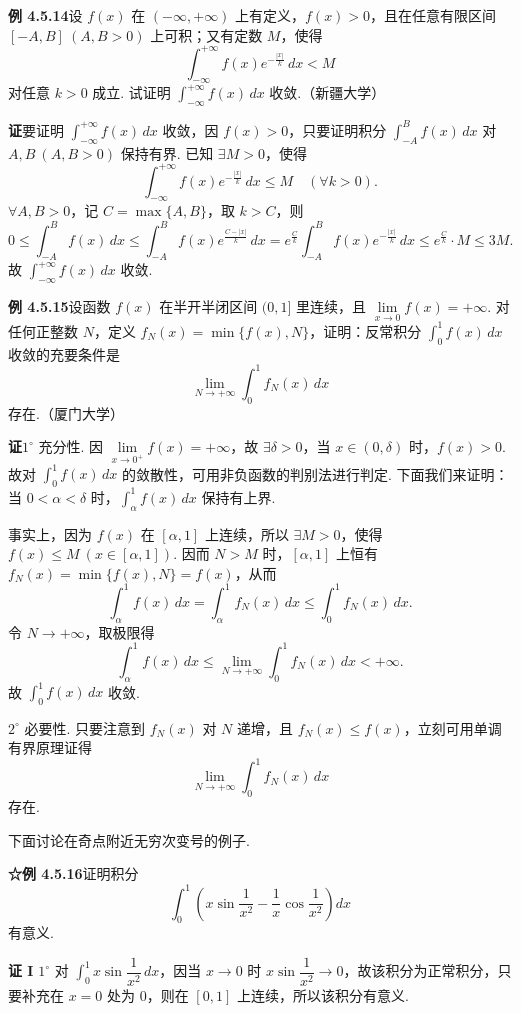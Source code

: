 \documentclass[UTF8, 12pt, fontset=fandol, oneside]{ctexart}
\begin{document}
\noindent\textbf{例 4.5.14}\quad 设 $f(x)$ 在 $(-\infty,+\infty)$ 上有定义，$f(x)>0$，且在任意有限区间 $[-A,B]\ (A,B>0)$ 上可积；又有定数 $M$，使得
\[
\int_{-\infty}^{+\infty}f(x)e^{-\frac{|x|}{k}}\,dx<M
\]
对任意 $k>0$ 成立. 试证明 $\displaystyle\int_{-\infty}^{+\infty}f(x)\,dx$ 收敛.（新疆大学）

\noindent\textbf{证}\quad 要证明 $\displaystyle\int_{-\infty}^{+\infty}f(x)\,dx$ 收敛，因 $f(x)>0$，只要证明积分 $\displaystyle\int_{-A}^B f(x)\,dx$ 对 $A,B\ (A,B>0)$ 保持有界. 已知 $\exists M>0$，使得
\[
\int_{-\infty}^{+\infty}f(x)e^{-\frac{|x|}{k}}\,dx\le M\quad(\forall k>0).
\]
$\forall A,B>0$，记 $C=\max\{A,B\}$，取 $k>C$，则
\[
0\le\int_{-A}^B f(x)\,dx
\le\int_{-A}^B f(x)e^{\frac{C-|x|}{k}}\,dx
=e^{\frac Ck}\int_{-A}^B f(x)e^{-\frac{|x|}{k}}\,dx
\le e^{\frac Ck}\cdot M\le3M.
\]
故 $\displaystyle\int_{-\infty}^{+\infty}f(x)\,dx$ 收敛.

\noindent\textbf{例 4.5.15}\quad 设函数 $f(x)$ 在半开半闭区间 $(0,1]$ 里连续，且 $\lim\limits_{x\to0}f(x)=+\infty$. 对任何正整数 $N$，定义 $f_N(x)=\min\{f(x),N\}$，证明：反常积分 $\displaystyle\int_0^1 f(x)\,dx$ 收敛的充要条件是
\[
\lim_{N\to+\infty}\int_0^1 f_N(x)\,dx
\]
存在.（厦门大学）

\noindent\textbf{证}\quad $1^\circ$ 充分性. 因 $\lim\limits_{x\to0^+}f(x)=+\infty$，故 $\exists\delta>0$，当 $x\in(0,\delta)$ 时，$f(x)>0$. 故对 $\displaystyle\int_0^1 f(x)\,dx$ 的敛散性，可用非负函数的判别法进行判定. 下面我们来证明：当 $0<\alpha<\delta$ 时，$\displaystyle\int_\alpha^1f(x)\,dx$ 保持有上界.

事实上，因为 $f(x)$ 在 $[\alpha,1]$ 上连续，所以 $\exists M>0$，使得 $f(x)\le M\ (x\in[\alpha,1])$. 因而 $N>M$ 时，$[\alpha,1]$ 上恒有 $f_N(x)=\min\{f(x),N\}=f(x)$，从而
\[
\int_\alpha^1 f(x)\,dx=\int_\alpha^1 f_N(x)\,dx
\le\int_0^1 f_N(x)\,dx.
\]
令 $N\to+\infty$，取极限得
\[
\int_\alpha^1 f(x)\,dx
\le\lim_{N\to+\infty}\int_0^1 f_N(x)\,dx<+\infty.
\]
故 $\displaystyle\int_0^1 f(x)\,dx$ 收敛.

$2^\circ$ 必要性. 只要注意到 $f_N(x)$ 对 $N$ 递增，且 $f_N(x)\le f(x)$，立刻可用单调有界原理证得
\[
\lim_{N\to+\infty}\int_0^1 f_N(x)\,dx
\]
存在.

下面讨论在奇点附近无穷次变号的例子.

\noindent\textbf{☆例 4.5.16}\quad 证明积分
\[
\int_0^1\left(x\sin\frac1{x^2}-\frac1x\cos\frac1{x^2}\right)dx
\]
有意义.

\noindent\textbf{证 I}\quad
$1^\circ$ 对 $\displaystyle\int_0^1x\sin\dfrac1{x^2}\,dx$，因当 $x\to0$ 时 $x\sin\dfrac1{x^2}\to0$，故该积分为正常积分，只要补充在 $x=0$ 处为 0，则在 $[0,1]$ 上连续，所以该积分有意义.
\end{document}
